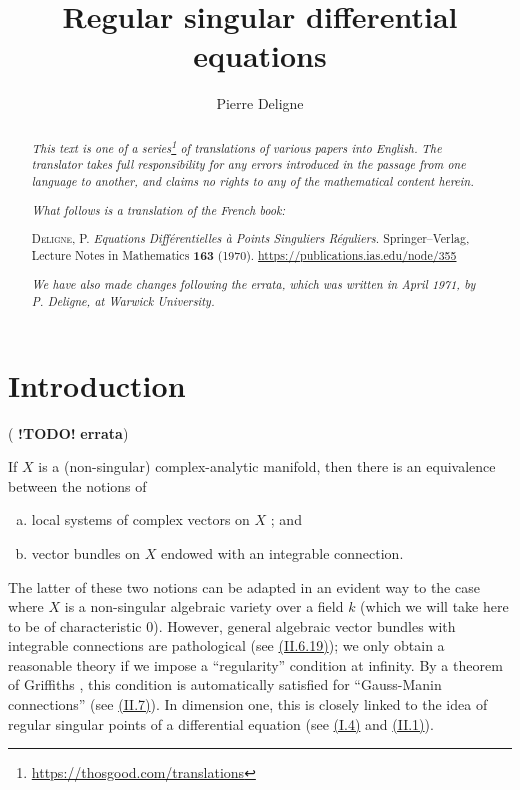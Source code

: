 \documentclass{report}
\title{Regular singular differential equations}
\author{Pierre Deligne}
\date{}
\newcommand{\doctype}{French book}
\newcommand{\origcit}{%
  \textsc{Deligne, P.}
  \emph{Equations Diff\'{e}rentielles \`{a} Points Singuliers R\'{e}guliers.}
  Springer--Verlag, Lecture Notes in Mathematics \textbf{163} (1970).
  {\url{https://publications.ias.edu/node/355}}%
}
\newcommand{\todo}{\textbf{ !TODO! }}
\newcommand{\oldpage}[1]{\marginpar{\footnotesize$\Big\vert$ \textit{p.~#1}}}
\begin{document}
\hypersetup{pageanchor=false}
\begin{titlepage}
\maketitle
\end{titlepage}

\renewcommand{\abstractname}{Translator's note.}

\begin{abstract}
  \renewcommand*{\thefootnote}{\fnsymbol{footnote}}
  \emph{This text is one of a series\footnote{\url{https://thosgood.com/translations}} of translations of various papers into English.}
  \emph{The translator takes full responsibility for any errors introduced in the passage from one language to another, and claims no rights to any of the mathematical content herein.}

  \medskip
  
  \emph{What follows is a translation of the \doctype:}

  \medskip\noindent
  \origcit

  \medskip
  \noindent\emph{We have also made changes following the errata, which was written in April 1971, by P. Deligne, at Warwick University.}
\end{abstract}

\hypersetup{pageanchor=true}

\setcounter{footnote}{0}

\tableofcontents



\setcounter{chapter}{-1}

\chapter{Introduction}
\label{0}

(\todo \textbf{errata})

\oldpage{1}
If $X$ is a (non-singular) complex-analytic manifold, then there is an equivalence between the notions of
\begin{enumerate}[a)]
  \item local systems of complex vectors on $X$ ; and
  \item vector bundles on $X$ endowed with an integrable connection.
\end{enumerate}

The latter of these two notions can be adapted in an evident way to the case where $X$ is a non-singular algebraic variety over a field $k$ (which we will take here to be of characteristic $0$).
However, general algebraic vector bundles with integrable connections are pathological (see \hyperref[II.6.19]{(II.6.19)});
we only obtain a reasonable theory if we impose a ``regularity'' condition at infinity.
By a theorem of Griffiths \cite{8}, this condition is automatically satisfied for ``Gauss-Manin connections'' (see \hyperref[II.7]{(II.7)}).
In dimension one, this is closely linked to the idea of regular singular points of a differential equation (see \hyperref[I.4]{(I.4)} and \hyperref[II.1]{(II.1)}).
\end{document}
